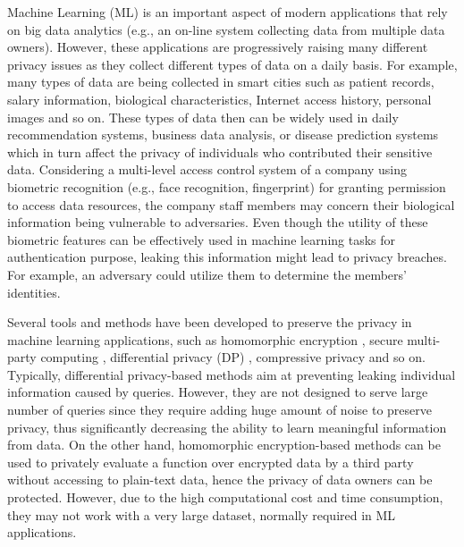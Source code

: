 

Machine Learning (ML) is an important aspect of modern applications that rely on big data analytics (e.g., an on-line system collecting data from multiple data owners). However, these applications are progressively raising many different privacy issues as they collect different types of data on a daily basis. For example, many types of data are being collected in smart cities such as patient records, salary information, biological characteristics, Internet access history, personal images and so on. These types of data then can be widely used in daily recommendation systems, business data analysis, or disease prediction systems which in turn affect the privacy of individuals who contributed their sensitive data. Considering a multi-level access control system of a company using biometric recognition (e.g., face recognition, fingerprint) for granting permission to access data resources, the company staff members may concern their biological information being vulnerable to adversaries. Even though the utility of these biometric features can be effectively used in machine learning tasks for authentication purpose, leaking this information might lead to privacy breaches. For example, an adversary could utilize them to determine the members' identities.

Several tools and methods have been developed to preserve the privacy in machine learning applications, such as homomorphic encryption \cite{Bost2015,Emekci2007,Hesamifard2017}, secure multi-party computing \cite{Yao1986,Shamir1979}, differential privacy (DP) \cite{Chaudhuri,Zhang2012,Phan2016,Abadi2016,XiaoqianJiangZhanglongJiShuangWangNomanMohammedSamuelCheng2013}, compressive privacy \cite{zhuang2017fripal,GAP,DBLP:journals/corr/abs-1809-08911,DifferentialPrivacywithCompression,7815484, Kung, XieKun} and so on. Typically, differential privacy-based methods aim at preventing leaking individual information caused by queries. However, they are not designed to serve large number of queries since they require adding huge amount of noise to preserve privacy, thus significantly decreasing the ability to learn meaningful information from data. On the other hand, homomorphic encryption-based methods can be used to privately evaluate a function over encrypted data by a third party without accessing to plain-text data, hence the privacy of data owners can be protected. However, due to the high computational cost and time consumption, they may not work with a very large dataset, normally required in ML applications.

